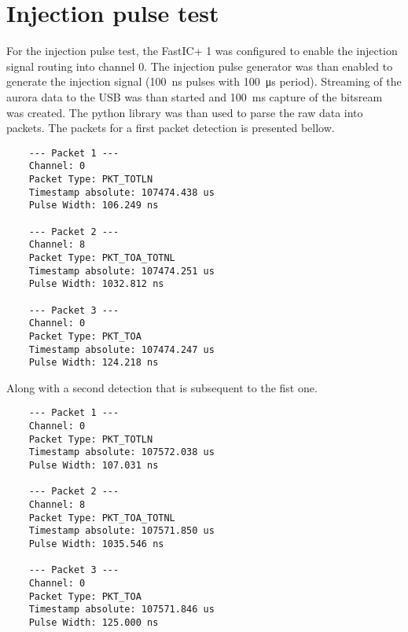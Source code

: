 \section{Injection pulse test}
For the injection pulse test, the FastIC+ 1 was configured to enable the injection signal routing into channel 0. The injection pulse generator was than enabled to generate the injection signal (\SI{100}{\nano\second} pulses with \SI{100}{\micro\second} period). Streaming of the aurora data to the USB was than started and \SI{100}{\milli\second} capture of the bitsream was created. The python library was than used to parse the raw data into packets. The packets for a first packet detection is presented bellow.
\begin{small}
\begin{verbatim}
    --- Packet 1 ---
    Channel: 0
    Packet Type: PKT_TOTLN
    Timestamp absolute: 107474.438 us
    Pulse Width: 106.249 ns
  
    --- Packet 2 ---
    Channel: 8
    Packet Type: PKT_TOA_TOTNL
    Timestamp absolute: 107474.251 us
    Pulse Width: 1032.812 ns
  
    --- Packet 3 ---
    Channel: 0
    Packet Type: PKT_TOA
    Timestamp absolute: 107474.247 us
    Pulse Width: 124.218 ns

\end{verbatim}
\end{small}
\newpage
Along with a second detection that is subsequent to the fist one.
\begin{small}
\begin{verbatim}
    --- Packet 1 ---
    Channel: 0
    Packet Type: PKT_TOTLN
    Timestamp absolute: 107572.038 us
    Pulse Width: 107.031 ns
  
    --- Packet 2 ---
    Channel: 8
    Packet Type: PKT_TOA_TOTNL
    Timestamp absolute: 107571.850 us
    Pulse Width: 1035.546 ns
  
    --- Packet 3 ---
    Channel: 0
    Packet Type: PKT_TOA
    Timestamp absolute: 107571.846 us
    Pulse Width: 125.000 ns
  
\end{verbatim}
\end{small}

